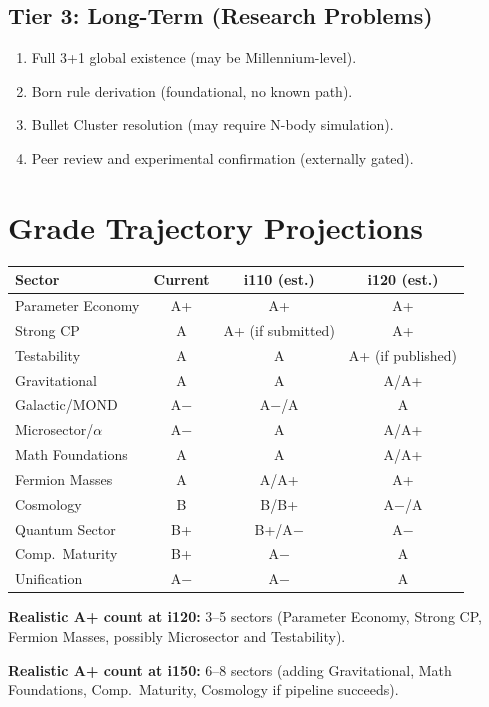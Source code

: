 \documentclass[11pt,a4paper]{article}
\begin{document}
\subsection{Tier 3: Long-Term (Research Problems)}

\begin{enumerate}
\item Full 3+1 global existence (may be Millennium-level).
\item Born rule derivation (foundational, no known path).
\item Bullet Cluster resolution (may require N-body simulation).
\item Peer review and experimental confirmation (externally gated).
\end{enumerate}

\section{Grade Trajectory Projections}

\begin{center}
\begin{tabular}{lccc}
\toprule
\textbf{Sector} & \textbf{Current} & \textbf{i110 (est.)} & \textbf{i120 (est.)} \\
\midrule
Parameter Economy & A+ & A+ & A+ \\
Strong CP & A & A+ (if submitted) & A+ \\
Testability & A & A & A+ (if published) \\
Gravitational & A & A & A/A+ \\
Galactic/MOND & A$-$ & A$-$/A & A \\
Microsector/$\alpha$ & A$-$ & A & A/A+ \\
Math Foundations & A & A & A/A+ \\
Fermion Masses & A & A/A+ & A+ \\
Cosmology & B & B/B+ & A$-$/A \\
Quantum Sector & B+ & B+/A$-$ & A$-$ \\
Comp.\ Maturity & B+ & A$-$ & A \\
Unification & A$-$ & A$-$ & A \\
\bottomrule
\end{tabular}
\end{center}

\textbf{Realistic A+ count at i120:} 3--5 sectors (Parameter Economy, Strong CP,
Fermion Masses, possibly Microsector and Testability).

\textbf{Realistic A+ count at i150:} 6--8 sectors (adding Gravitational, Math
Foundations, Comp.\ Maturity, Cosmology if pipeline succeeds).
\end{document}
